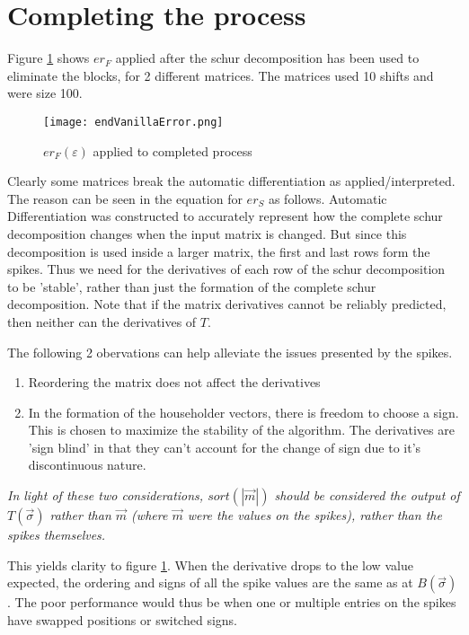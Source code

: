 \documentclass{article}
\newcommand{\s}{\vec{\sigma}}
\newcommand{\e}{\varepsilon}
\begin{document}
\section{Completing the process}

Figure \ref{fig:vanErr} shows $er_F$ applied after the schur decomposition
has been used to eliminate the blocks, for 2 different matrices.
The matrices used 10 shifts and were size 100.

\begin{figure}[h!]
  \centering
  \texttt{[image: endVanillaError.png]}
  \caption{$er_F(\e)$ applied to completed process}\label{fig:vanErr}
\end{figure}

Clearly some matrices break the automatic differentiation as applied/interpreted.
The reason can be seen in the equation for $er_S$ as follows.
Automatic Differentiation was constructed to accurately represent how
the complete schur decomposition changes when the input matrix is changed.
But since this decomposition is used inside a larger matrix, the first
and last rows form the spikes.
Thus we need for the derivatives of each row of the schur decomposition to be
'stable', rather than just the formation of the complete schur decomposition.
Note that if the matrix derivatives cannot be reliably predicted, then neither
can the derivatives of $T$.

The following 2 obervations can help alleviate the issues presented by the spikes.
\begin{enumerate}
  \item Reordering the matrix does not affect the derivatives
  \item In the formation of the householder vectors, there is freedom to choose a sign.
  This is chosen to maximize the stability of the algorithm. The derivatives are
  'sign blind' in that they can't account for the change of sign due to it's discontinuous
  nature.
\end{enumerate}

\textit{In light of these two considerations, 
$sort(|\vec{m}|)$ should be considered the output of $T(\s)$ rather than $\vec{m}$ 
(where $\vec{m}$ were the values on the spikes), rather than the spikes themselves.}

This yields clarity to figure \ref{fig:vanErr}.
When the derivative drops to the low value expected, the ordering and signs of all
the spike values are the same as at $B(\s)$.
The poor performance would thus be when one or multiple entries on the spikes
have swapped positions or switched signs.
\end{document}
